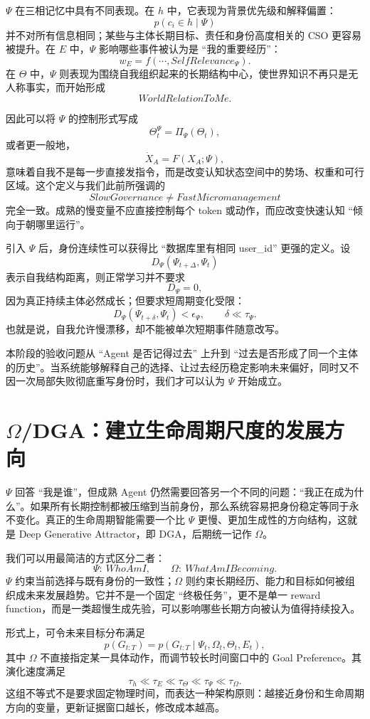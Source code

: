 $\Psi$ 在三相记忆中具有不同表现。在 $h$ 中，它表现为背景优先级和解释偏置：
\[
p(c_i\in h\mid \Psi)
\]
并不对所有信息相同；某些与主体长期目标、责任和身份高度相关的 CSO 更容易被提升。在 $E$ 中，$\Psi$ 影响哪些事件被认为是 ``我的重要经历''：
\[
w_E
=
f(\cdots,SelfRelevance_\Psi).
\]
在 $\Theta$ 中，$\Psi$ 则表现为围绕自我组织起来的长期结构中心，使世界知识不再只是无人称事实，而开始形成
\[
WorldRelationToMe.
\]

因此可以将 $\Psi$ 的控制形式写成
\[
\Theta_t^\Psi
=
\Pi_\Psi(\Theta_t),
\]
或者更一般地，
\[
\dot X_A
=
F(X_A;\Psi),
\]
意味着自我不是每一步直接发指令，而是改变认知状态空间中的势场、权重和可行区域。这个定义与我们此前所强调的
\[
\boxed{
SlowGovernance\neq FastMicromanagement
}
\]
完全一致。成熟的慢变量不应直接控制每个 token 或动作，而应改变快速认知 ``倾向于朝哪里运行''。

引入 $\Psi$ 后，身份连续性可以获得比 ``数据库里有相同 user\_id'' 更强的定义。设
\[
D_\Psi(\Psi_{t+\Delta},\Psi_t)
\]
表示自我结构距离，则正常学习并不要求
\[
D_\Psi=0,
\]
因为真正持续主体必然成长；但要求短周期变化受限：
\[
D_\Psi(\Psi_{t+\delta},\Psi_t)
<
\epsilon_\Psi,
\qquad
\delta\ll\tau_\Psi.
\]
也就是说，自我允许慢漂移，却不能被单次短期事件随意改写。

本阶段的验收问题从 ``Agent 是否记得过去'' 上升到 ``过去是否形成了同一个主体的历史''。当系统能够解释自己的选择、让过去经历稳定影响未来偏好，同时又不因一次局部失败彻底重写身份时，我们才可以认为 $\Psi$ 开始成立。

\section{$\Omega$/DGA：建立生命周期尺度的发展方向}

$\Psi$ 回答 ``我是谁''，但成熟 Agent 仍然需要回答另一个不同的问题：``我正在成为什么''。如果所有长期控制都被压缩到当前身份，那么系统容易把身份稳定等同于永不变化。真正的生命周期智能需要一个比 $\Psi$ 更慢、更加生成性的方向结构，这就是 Deep Generative Attractor，即 DGA，后期统一记作 $\Omega$。

我们可以用最简洁的方式区分二者：
\[
\boxed{
\Psi:\ WhoAmI,
\qquad
\Omega:\ WhatAmIBecoming.
}
\]
$\Psi$ 约束当前选择与既有身份的一致性；$\Omega$ 则约束长期经历、能力和目标如何被组织成未来发展趋势。它并不是一个固定 ``终极任务''，更不是单一 reward function，而是一类超慢生成先验，可以影响哪些长期方向被认为值得持续投入。

形式上，可令未来目标分布满足
\[
p(G_{t:T})
=
p(G_{t:T}\mid
\Psi_t,\Omega_t,\Theta_t,E_t),
\]
其中 $\Omega$ 不直接指定某一具体动作，而调节较长时间窗口中的 Goal Preference。其演化速度满足
\[
\tau_h
\ll
\tau_E
\ll
\tau_\Theta
\ll
\tau_\Psi
\ll
\tau_\Omega.
\]
这组不等式不是要求固定物理时间，而表达一种架构原则：越接近身份和生命周期方向的变量，更新证据窗口越长，修改成本越高。

